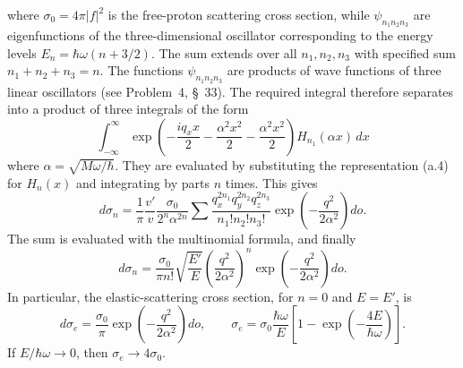 where $\sigma_0=4\pi|f|^2$ is the free-proton scattering cross section, while $\psi_{n_1n_2n_3}$ are eigenfunctions of the three-dimensional oscillator corresponding to the energy levels $E_n=\hbar\omega(n+3/2)$. The sum extends over all $n_1,n_2,n_3$ with specified sum $n_1+n_2+n_3=n$. The functions $\psi_{n_1n_2n_3}$ are products of wave functions of three linear oscillators (see Problem~4, §~33). The required integral therefore separates into a product of three integrals of the form
\[
 \int_{-\infty}^{\infty}\exp\left(-\frac{iq_xx}{2}-\frac{\alpha^2x^2}{2}-\frac{\alpha^2x^2}{2}\right)H_{n_1}(\alpha x)\,dx
\]
where $\alpha=\sqrt{M\omega/\hbar}$. They are evaluated by substituting the representation (a.4) for $H_n(x)$ and integrating by parts $n$ times. This gives
\[
 d\sigma_n=\frac1\pi\frac{v'}v\frac{\sigma_0}{2^n\alpha^{2n}}
 \sum\frac{q_x^{2n_1}q_y^{2n_2}q_z^{2n_3}}{n_1!n_2!n_3!}
 \exp\left(-\frac{q^2}{2\alpha^2}\right)do.
\]
The sum is evaluated with the multinomial formula, and finally
\[
 d\sigma_n=\frac{\sigma_0}{\pi n!}\sqrt{\frac{E'}E}
 \left(\frac{q^2}{2\alpha^2}\right)^n
 \exp\left(-\frac{q^2}{2\alpha^2}\right)do.
\]
In particular, the elastic-scattering cross section, for $n=0$ and $E=E'$, is
\[
 d\sigma_e=\frac{\sigma_0}{\pi}\exp\left(-\frac{q^2}{2\alpha^2}\right)do,
 \qquad
 \sigma_e=\sigma_0\frac{\hbar\omega}{E}
 \left[1-\exp\left(-\frac{4E}{\hbar\omega}\right)\right].
\]
If $E/\hbar\omega\longrightarrow0$, then $\sigma_e\longrightarrow4\sigma_0$.
